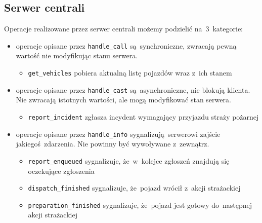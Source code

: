 \documentclass{article}
\begin{document}
\subsection{Serwer centrali}
Operacje realizowane przez serwer centrali możemy podzielić na~3~kategorie:
\begin{itemize}
	\item operacje opisane przez \texttt{handle\_call} są~synchroniczne, zwracają pewną wartość nie modyfikując stanu serwera.
	\begin{itemize}
		\item \texttt{get\_vehicles} pobiera aktualną listę pojazdów wraz z~ich stanem
	\end{itemize}

	\item operacje opisane przez \texttt{handle\_cast} są~asynchroniczne, nie blokują klienta. Nie zwracają istotnych wartości, ale mogą modyfikować stan serwera.
	\begin{itemize}
		\item \texttt{report\_incident} zgłasza incydent wymagający przyjazdu straży pożarnej
	\end{itemize}

	\item operacje opisane przez \texttt{handle\_info} sygnalizują serwerowi zajście jakiegoś zdarzenia. Nie powinny być wywoływane z~zewnątrz.
	\begin{itemize}
		\item \texttt{report\_enqueued} sygnalizuje, że~w~kolejce zgłoszeń znajdują się oczekujące zgłoszenia
		\item \texttt{dispatch\_finished} sygnalizuje, że~pojazd wrócił z~akcji strażackiej
		\item \texttt{preparation\_finished} sygnalizuje, że~pojazd jest gotowy do~następnej akcji strażackiej
	\end{itemize}
\end{itemize}

\end{document}
